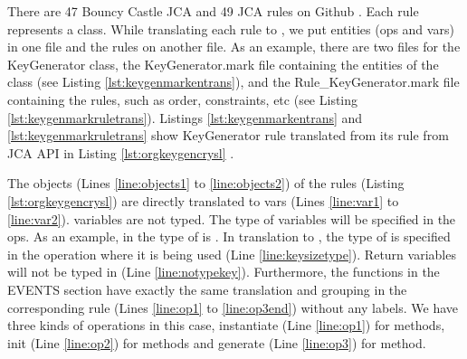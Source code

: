 There are 47 Bouncy Castle JCA and 49 JCA \crysl{} rules on Github \cite{apirules}. Each \crysl{} rule represents a class. While translating each rule to \MARK{}, we put entities (ops and vars) in one file and the rules on another file. As an example, there are two \MARK{} files for the KeyGenerator class, the KeyGenerator.mark file containing the entities of the class (see Listing \ref{lst:keygenmarkentrans}), and the Rule\_KeyGenerator.mark file containing the rules, such as order, constraints, etc (see Listing \ref{lst:keygenmarkruletrans}). Listings \ref{lst:keygenmarkentrans} and \ref{lst:keygenmarkruletrans} show KeyGenerator \MARK{} rule translated from its \crysl{} rule from JCA API in Listing \ref{lst:orgkeygencrysl} \cite{apirules}.

The objects (Lines \ref{line:objects1} to \ref{line:objects2}) of the \crysl{} rules (Listing \ref{lst:orgkeygencrysl}) are directly translated to vars (Lines \ref{line:var1} to \ref{line:var2}). \MARK{} variables are not typed. The type of variables will be specified in the ops. As an example, in \crysl{} the type of  is . In translation to \MARK{}, the type of  is specified in the operation where it is being used (Line \ref{line:keysizetype}). Return variables will not be typed in \MARK{} (Line \ref{line:notypekey}). Furthermore, the functions in the EVENTS section have exactly the same translation and grouping in the corresponding \MARK{} rule (Lines \ref{line:op1} to \ref{line:op3end}) without any labels. We have three kinds of operations in this case, instantiate (Line \ref{line:op1}) for  methods, init (Line \ref{line:op2}) for  methods and generate (Line \ref{line:op3}) for  method.
\pagebreak

